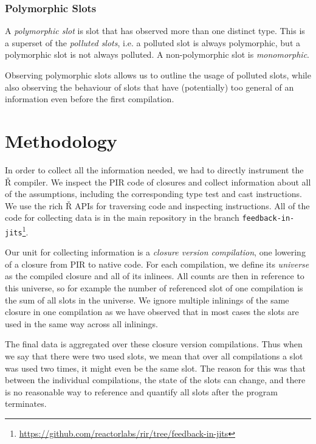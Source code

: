 \subsubsection*{Polymorphic Slots}

A \textit{polymorphic slot} is slot that has observed more than one distinct type. This is a superset of the \textit{polluted slots}, i.e. a polluted slot is always polymorphic, but a polymorphic slot is not always polluted. A non-polymorphic slot is \textit{monomorphic}.

Observing polymorphic slots allows us to outline the usage of polluted slots, while also observing the behaviour of slots that have (potentially) too general of an information even before the first compilation.

\section{Methodology}

In order to collect all the information needed, we had to directly instrument the Ř compiler. We inspect the PIR code of closures and collect information about all of the assumptions, including the corresponding type test and cast instructions. We use the rich Ř APIs for traversing code and inspecting instructions. All of the code for collecting data is in the main repository in the branch \texttt{feedback-in-jits}\footnote{\url{https://github.com/reactorlabs/rir/tree/feedback-in-jits}}.

Our unit for collecting information is a \textit{closure version compilation}, one lowering of a closure from PIR to native code. For each compilation, we define its \textit{universe} as the compiled closure and all of its inlinees. All counts are then in reference to this universe, so for example the number of referenced slot of one compilation is the sum of all slots in the universe. We ignore multiple inlinings of the same closure in one compilation as we have observed that in most cases the slots are used in the same way across all inlinings.

The final data is aggregated over these closure version compilations. Thus when we say that there were two used slots, we mean that over all compilations a slot was used two times, it might even be the same slot. The reason for this was that between the individual compilations, the state of the slots can change, and there is no reasonable way to reference and quantify all slots after the program terminates.

